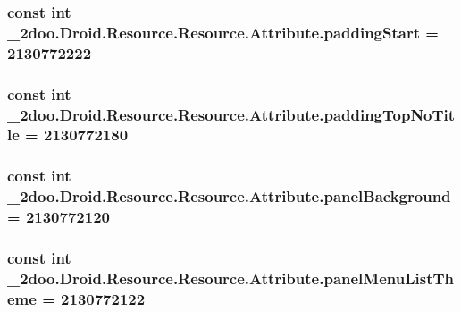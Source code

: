 \hypertarget{class__2doo_1_1_droid_1_1_resource_1_1_attribute_7c118c5508fb976f5226617d23a5e49a}{
\subsubsection[{paddingStart}]{\setlength{\rightskip}{0pt plus 5cm}const int \_\-2doo.Droid.Resource.Resource.Attribute.paddingStart = 2130772222}}
\label{class__2doo_1_1_droid_1_1_resource_1_1_attribute_7c118c5508fb976f5226617d23a5e49a}


\hypertarget{class__2doo_1_1_droid_1_1_resource_1_1_attribute_ffc6fe62fe220002ee7aef4cb9ec0dc9}{
\subsubsection[{paddingTopNoTitle}]{\setlength{\rightskip}{0pt plus 5cm}const int \_\-2doo.Droid.Resource.Resource.Attribute.paddingTopNoTitle = 2130772180}}
\label{class__2doo_1_1_droid_1_1_resource_1_1_attribute_ffc6fe62fe220002ee7aef4cb9ec0dc9}


\hypertarget{class__2doo_1_1_droid_1_1_resource_1_1_attribute_dd8650776f7f151955d47b6ab628551d}{
\subsubsection[{panelBackground}]{\setlength{\rightskip}{0pt plus 5cm}const int \_\-2doo.Droid.Resource.Resource.Attribute.panelBackground = 2130772120}}
\label{class__2doo_1_1_droid_1_1_resource_1_1_attribute_dd8650776f7f151955d47b6ab628551d}


\hypertarget{class__2doo_1_1_droid_1_1_resource_1_1_attribute_c87d5be9e07ff45aea8e21df7dce7dc1}{
\subsubsection[{panelMenuListTheme}]{\setlength{\rightskip}{0pt plus 5cm}const int \_\-2doo.Droid.Resource.Resource.Attribute.panelMenuListTheme = 2130772122}}
\label{class__2doo_1_1_droid_1_1_resource_1_1_attribute_c87d5be9e07ff45aea8e21df7dce7dc1}


